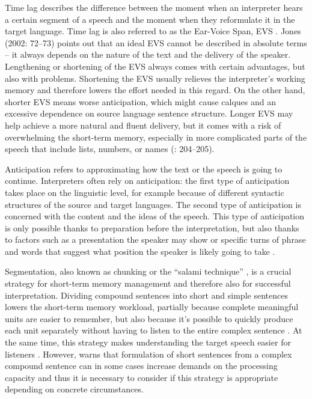 \documentclass[output=paper]{langscibook}
\begin{document}

Time lag describes the difference between the moment when an interpreter hears a certain segment of a speech and the moment when they reformulate it in the target language. Time lag is also referred to as the Ear-Voice Span, EVS \citep[204]{Gile2009}. Jones (2002: 72–73) points out that an ideal EVS cannot be described in absolute terms – it always depends on the nature of the text and the delivery of the speaker. Lengthening or shortening of the EVS always comes with certain advantages, but also with problems. Shortening the EVS usually relieves the interpreter’s working memory and therefore lowers the effort needed in this regard. On the other hand, shorter EVS means worse anticipation, which might cause calques and an excessive dependence on source language sentence structure. Longer EVS may help achieve a more natural and fluent delivery, but it comes with a risk of overwhelming the short-term memory, especially in more complicated parts of the speech that include lists, numbers, or names (\citealt{Gile2009}: 204–205).


Anticipation refers to approximating how the text or the speech is going to continue. Interpreters often rely on anticipation: the first type of anticipation takes place on the linguistic level, for example because of different syntactic structures of the source and target languages. The second type of anticipation is concerned with the content and the ideas of the speech. This type of anticipation is only possible thanks to preparation before the interpretation, but also thanks to factors such as a presentation the speaker may show or specific turns of phrase and words that suggest what position the speaker is likely going to take \citep[174]{Gile2009}.


Segmentation, also known as chunking \citep[117]{Kalina1998} or the “salami technique” \citep[91]{Jones2002}, is a crucial strategy for short-term memory management and therefore also for successful interpretation. Dividing compound sentences into short and simple sentences lowers the short-term memory workload, partially because complete meaningful units are easier to remember, but also because it’s possible to quickly produce each unit separately without having to listen to the entire complex sentence \citep[117]{Kalina1998}. At the same time, this strategy makes understanding the target speech easier for listeners \citep[93]{Jones2002}. However, \citet[205]{Gile2009} warns that formulation of short sentences from a complex compound sentence can in some cases increase demands on the processing capacity and thus it is necessary to consider if this strategy is appropriate depending on concrete circumstances.
\end{document}
